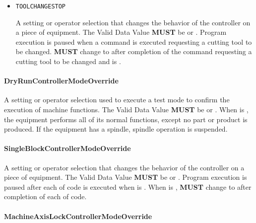 \begin{itemize}
\item \texttt{TOOL\textunderscore CHANGE\textunderscore STOP}


A setting or operator selection that changes the behavior of the controller on a piece of equipment. 
 The \gls{Valid Data Value} \textbf{MUST} be  or . 
 Program execution is paused when a command is executed requesting a cutting tool to be changed. 
  \textbf{MUST} change to  after completion of the command requesting a cutting tool to be changed and  is .


\end{itemize}

\paragraph{DryRunControllerModeOverride}\mbox{}
\label{sec:DryRunControllerModeOverride}


A setting or operator selection used to execute a test mode to confirm the execution of machine functions. 
 The \gls{Valid Data Value} \textbf{MUST} be  or . 
 When  is , the equipment performs all of its normal functions, except no part or product is produced.  If the equipment has a spindle, spindle operation is suspended.


\paragraph{SingleBlockControllerModeOverride}\mbox{}
\label{sec:SingleBlockControllerModeOverride}


A setting or operator selection that changes the behavior of the controller on a piece of equipment. 
 The \gls{Valid Data Value} \textbf{MUST} be  or .
 Program execution is paused after each  of code is executed when  is .   
 When  is ,  \textbf{MUST} change to  after completion of each  of code. 


\paragraph{MachineAxisLockControllerModeOverride}\mbox{}
\label{sec:MachineAxisLockControllerModeOverride}


